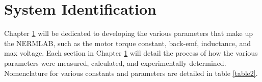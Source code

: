
\cleardoublepage


\chapter{System Identification}
\label{chp3}

Chapter \ref{chp3} will be dedicated to developing the various parameters that make up the NERMLAB, such as the motor torque constant, \ac{back-emf}, inductance, and max voltage. Each section in Chapter \ref{chp3} will detail the process of how the various parameters were measured, calculated, and experimentally determined. Nomenclature for various constants and parameters are detailed in table \ref{table2}.

